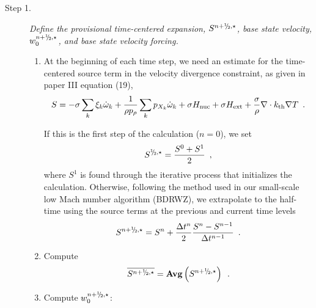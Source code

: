\begin{description}

\item[Step 1.] {\em Define the provisional time-centered expansion, $S^{n+\myhalf,\star}$, 
base state velocity, $w_0^{n+\myhalf,\star}$, and base state velocity forcing.}

\begin{enumerate}
\renewcommand{\theenumi}{{\bf \alph{enumi}}}

\item At the beginning of each time step, we need an estimate for the time-centered
source term in the velocity divergence constraint, as given in paper III equation (19),
\begin{equation}
  S =  -\sigma  \sum_k  \xi_k \dot{\omega}_k  + 
  \frac{1}{\rho p_\rho} \sum_k p_{X_k}  {\dot{\omega}}_k  + \sigma {H_{\rm nuc}} + \sigma {H_{\rm ext}} 
  + \frac{\sigma}{\rho}\nabla\cdot k_{\rm th}\nabla T \enskip .
\label{eq:defineS} 
\end{equation}

If this is the first step of the calculation ($n=0$), we set
\begin{equation}
S^{\myhalf,\star} = \frac{S^0 + S^1}{2} \enskip ,
\end{equation}
where $S^1$ is found through the iterative process that initializes the calculation.
Otherwise, following the method used in our small-scale low Mach number algorithm
(BDRWZ), we extrapolate to the half-time using the source
terms at the previous and current time levels
\begin{equation}
S^{\nph,\star} = S^n + \frac{\Delta t^n}{2} \frac{S^n - S^{n-1}}{\Delta t^{n-1}} \enskip .
\end{equation}
\item Compute
\begin{equation}
\overline{S^{\nph,\star}} = {\mathrm{\bf Avg}} \left(S^{\nph,\star}\right) \enskip .
\end{equation}
\item Compute $w_0^{n+\myhalf,\star}$:


\end{enumerate}
\end{description}
